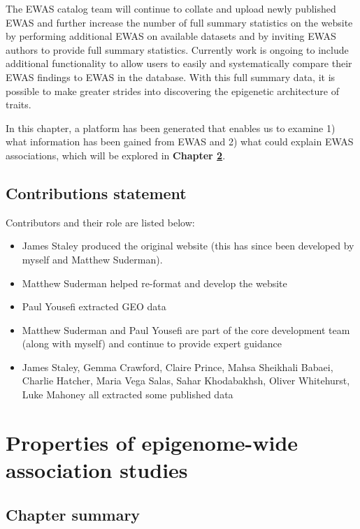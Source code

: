 \documentclass[11pt,oneside]{bristolthesis}
\providecommand{\tightlist}{%
  \setlength{\itemsep}{0pt}\setlength{\parskip}{0pt}}
\begin{document}
The EWAS catalog team will continue to collate and upload newly published EWAS and further increase the number of full summary statistics on the website by performing additional EWAS on available datasets and by inviting EWAS authors to provide full summary statistics. Currently work is ongoing to include additional functionality to allow users to easily and systematically compare their EWAS findings to EWAS in the database. With this full summary data, it is possible to make greater strides into discovering the epigenetic architecture of traits.

In this chapter, a platform has been generated that enables us to examine 1) what information has been gained from EWAS and 2) what could explain EWAS associations, which will be explored in \textbf{Chapter \ref{properties-of-ewas}}.

\hypertarget{contributions-statement-03}{%
\section{Contributions statement}\label{contributions-statement-03}}

Contributors and their role are listed below:
\begin{itemize}
\tightlist
\item
  James Staley produced the original website (this has since been developed by myself and Matthew Suderman).
\item
  Matthew Suderman helped re-format and develop the website
\item
  Paul Yousefi extracted GEO data
\item
  Matthew Suderman and Paul Yousefi are part of the core development team (along with myself) and continue to provide expert guidance
\item
  James Staley, Gemma Crawford, Claire Prince, Mahsa Sheikhali Babaei, Charlie Hatcher, Maria Vega Salas, Sahar Khodabakhsh, Oliver Whitehurst, Luke Mahoney all extracted some published data
\end{itemize}
\hypertarget{properties-of-ewas}{%
\chapter{Properties of epigenome-wide association studies}\label{properties-of-ewas}}

\hypertarget{chapter-summary-04}{%
\section{Chapter summary}\label{chapter-summary-04}}
\end{document}
